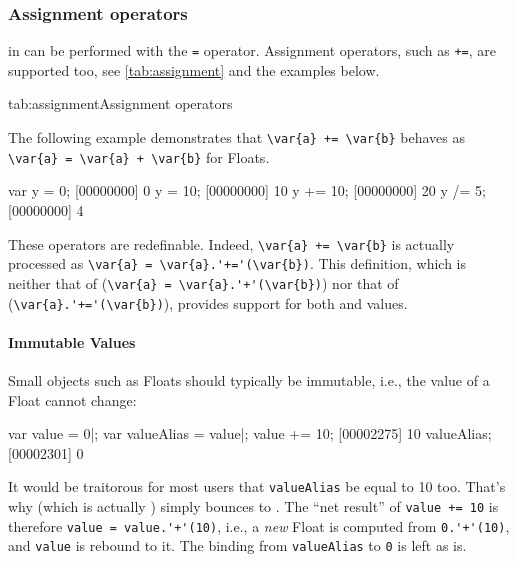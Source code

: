 \subsubsection{Assignment operators}
\label{sec:lang:op:ass}


 in \us can be performed with the \lstinline|=| operator.
Assignment operators, such as \lstinline|+=|, are supported too, see
\autoref{tab:assignment} and the examples below.


\begin{operatorTable}{tab:assignment}{Assignment operators}
  \operatorass[\footnotemark]\\
  \operatorsiass
\end{operatorTable}


The following example demonstrates that \lstinline|\var{a} += \var{b}|
behaves as \lstinline|\var{a} = \var{a} + \var{b}| for Floats.
\begin{urbiscript}
var y = 0;
[00000000] 0
y = 10;
[00000000] 10
y += 10;
[00000000] 20
y /= 5;
[00000000] 4
\end{urbiscript}

These operators are redefinable.  Indeed, \lstinline|\var{a} += \var{b}| is
actually processed as \lstinline|\var{a} = \var{a}.'+='(\var{b})|.  This
definition, which is neither that of \langC
(\lstinline|\var{a} = \var{a}.'+'(\var{b})|) nor that of \Cxx
(\lstinline|\var{a}.'+='(\var{b})|), provides support for both
 and  values.

\paragraph{Immutable Values}
Small objects such as Floats should typically be immutable, i.e., the value
of a Float cannot change:

\begin{urbiscript}
var value = 0|;
var valueAlias = value|;
value += 10;
[00002275] 10
valueAlias;
[00002301] 0
\end{urbiscript}

It would be traitorous for most users that \lstinline{valueAlias} be equal
to 10 too.  That's why  (which is actually
) simply bounces to .  The ``net
result'' of \lstinline|value += 10| is therefore
\lstinline|value = value.'+'(10)|, i.e., a \emph{new} Float is computed from
\lstinline|0.'+'(10)|, and \lstinline{value} is rebound to it.  The binding
from \lstinline{valueAlias} to \lstinline|0| is left as is.

